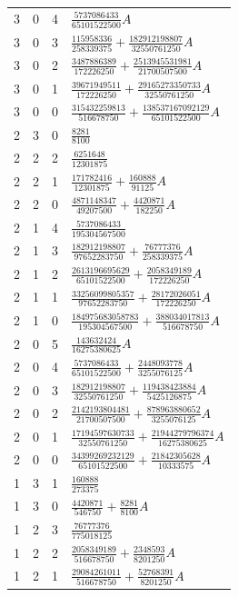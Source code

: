 \begin{longtable}{rrrl}
3 & 0 & 4 & $\frac{5737086433}{65101522500}A$\\
3 & 0 & 3 & $\frac{115958336}{258339375}+\frac{182912198807}{32550761250}A$\\
3 & 0 & 2 & $\frac{3487886389}{172226250}+\frac{2513945531981}{21700507500}A$\\
3 & 0 & 1 & $\frac{39671949511}{172226250}+\frac{29165273350733}{32550761250}A$\\
3 & 0 & 0 & $\frac{315432259813}{516678750}+\frac{138537167092129}{65101522500}A$\\
2 & 3 & 0 & $\frac{8281}{8100}$\\
2 & 2 & 2 & $\frac{6251648}{12301875}$\\
2 & 2 & 1 & $\frac{171782416}{12301875}+\frac{160888}{91125}A$\\
2 & 2 & 0 & $\frac{4871148347}{49207500}+\frac{4420871}{182250}A$\\
2 & 1 & 4 & $\frac{5737086433}{195304567500}$\\
2 & 1 & 3 & $\frac{182912198807}{97652283750}+\frac{76777376}{258339375}A$\\
2 & 1 & 2 & $\frac{2613196695629}{65101522500}+\frac{2058349189}{172226250}A$\\
2 & 1 & 1 & $\frac{33256099805357}{97652283750}+\frac{28172026051}{172226250}A$\\
2 & 1 & 0 & $\frac{184975683058783}{195304567500}+\frac{388034017813}{516678750}A$\\
2 & 0 & 5 & $\frac{143632424}{16275380625}A$\\
2 & 0 & 4 & $\frac{5737086433}{65101522500}+\frac{2448093778}{3255076125}A$\\
2 & 0 & 3 & $\frac{182912198807}{32550761250}+\frac{119438423884}{5425126875}A$\\
2 & 0 & 2 & $\frac{2142193804481}{21700507500}+\frac{878963880652}{3255076125}A$\\
2 & 0 & 1 & $\frac{17194597630733}{32550761250}+\frac{21944279796374}{16275380625}A$\\
2 & 0 & 0 & $\frac{34399269232129}{65101522500}+\frac{21842305628}{10333575}A$\\
1 & 3 & 1 & $\frac{160888}{273375}$\\
1 & 3 & 0 & $\frac{4420871}{546750}+\frac{8281}{8100}A$\\
1 & 2 & 3 & $\frac{76777376}{775018125}$\\
1 & 2 & 2 & $\frac{2058349189}{516678750}+\frac{2348593}{8201250}A$\\
1 & 2 & 1 & $\frac{29084261011}{516678750}+\frac{52768391}{8201250}A$\\

\end{longtable}
